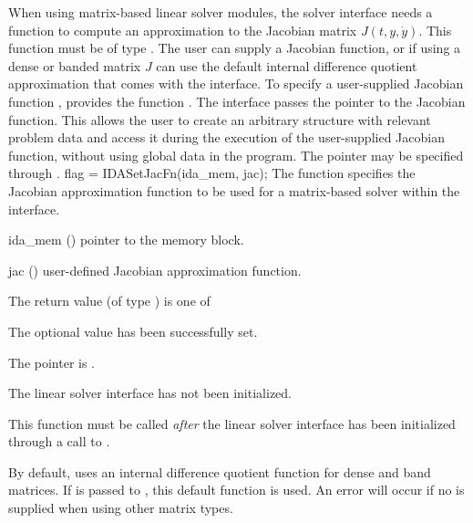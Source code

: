 {
When using matrix-based linear solver modules, the {\idals} solver
interface needs a function to compute an approximation to the Jacobian
matrix $J(t,y,\dot{y})$.  This function must be of type
.  The user can supply a Jacobian function, or if using a
dense or banded matrix $J$ can use the default internal difference
quotient approximation
that comes with the {\idals} interface.
To specify a user-supplied Jacobian function , {\idals} provides
the function .
The {\idals} interface passes the pointer 
to the Jacobian function. This allows the user to
create an arbitrary structure with relevant problem data and access it
during the execution of the user-supplied Jacobian function, without
using global data in the program.
The pointer  may be specified through .
{
  flag = IDASetJacFn(ida\_mem, jac);
}
{
  The function  specifies the Jacobian
  approximation function to be used for a matrix-based solver within
  the {\idals} interface.
}
{
  \begin{args}
  \item[ida\_mem] ()
    pointer to the {\idas} memory block.
  \item[jac] ()
    user-defined Jacobian approximation function.
  \end{args}
}
{
  The return value  (of type ) is one of
  \begin{args}
  \item[\Id{IDALS\_SUCCESS}]
    The optional value has been successfully set.
  \item[\Id{IDALS\_MEM\_NULL}]
    The  pointer is .
  \item[\Id{IDALS\_LMEM\_NULL}]
    The {\idals} linear solver interface has not been initialized.
  \end{args}
}
{
  This function must be called \emph{after} the {\idals} linear solver
  interface has been initialized through a call to
  .

  By default, {\idals} uses an internal difference quotient function
  for dense and band matrices.  If  is passed to ,
  this default function is used.  An error will occur if no 
  is supplied when using other matrix types.

}}
